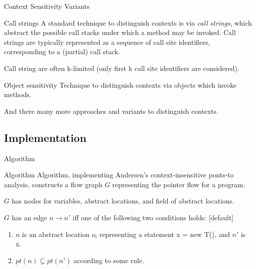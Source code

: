 \documentclass{beamer}
\begin{document}
\begin{frame}{Context Sensitivity Variants}
	\begin{block}{Call strings}
		A standard technique to distinguish contexts is via \textit{call strings}, which abstract the possible call
		stacks under which a method may be invoked. Call strings are typically represented as
		a sequence of call site identifiers, corresponding to a (partial) call stack.
	\end{block}
	\pause
	\begin{block}{}
		Call string are often k-limited (only first k call site identifiers are considered).
	\end{block}
	\pause
	\begin{block}{Object sensitivity}
		Technique to distinguish contexts via objects which invoke methods.
	\end{block}
	\pause
	\begin{block}{}
		And there many more approaches and variants to distinguish contexts.
	\end{block}
\end{frame}

\subsection{Implementation}

\begin{frame}{Algorithm}
	\begin{block}{Algorithm}
		Algorithm, implementing Andersen's context-insensitive ponts-to analysis, constructs a flow graph 
		$G$ representing the pointer flow for a program.
	\end{block}
	\pause
	\begin{block}{}
		$G$ has nodes for variables, abstract locations, and field of abstract locations. 
	\end{block}
	\pause
	\begin{block}{}
		$G$ has an edge $n \rightarrow n'$ iff one of the following two conditions holds:
		[default]
		\begin{enumerate}
   			\item $n$ is an abstract location $o_i$ representing a statement x = new T(), and $n'$
   			is x.
   			\item $pt(n) \subseteq pt(n')$ according to some rule.
		\end{enumerate}
	\end{block}
\end{frame}
\end{document}
